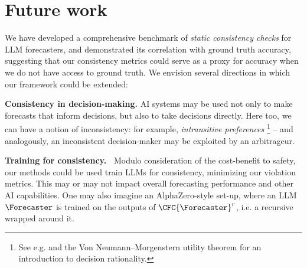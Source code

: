 \section{Future work}
\label{cfc/sec:future-work}

We have developed a comprehensive benchmark of \emph{static consistency checks} for LLM forecasters, and demonstrated its correlation with ground truth accuracy, suggesting that our consistency metrics could serve as a proxy for accuracy when we do not have access to ground truth. We envision several directions in which our framework could be extended:



\textbf{Consistency in decision-making.} AI systems may be used not only to make forecasts that inform decisions, but also to take decisions directly. Here too, we can have a notion of inconsistency: for example, \emph{intransitive preferences}
\footnote{See e.g. \cite{fishburnUtilityTheoryDecision1970} and the Von Neumann–Morgenstern utility theorem for an introduction to decision rationality.} -- and analogously, an inconsistent decision-maker may be exploited by an arbitrageur.


\textbf{Training for consistency.~}
Modulo consideration of the cost-benefit to safety,
our methods could be used train LLMs for consistency,
minimizing our violation metrics.
This may or may not impact overall forecasting performance and other AI capabilities.
One may also imagine an AlphaZero-style set-up, where an LLM $\Forecaster$ is trained on the outputs of $\CFC{\Forecaster}^r$, i.e. a recursive \CFCaster{} wrapped around it.


